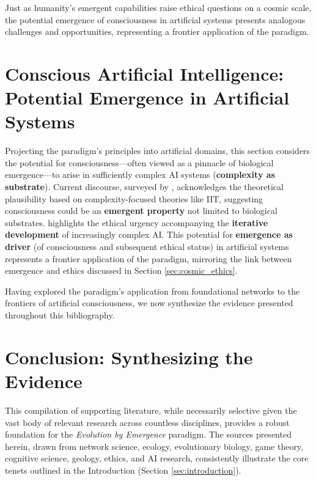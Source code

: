 Just as humanity's emergent capabilities raise ethical questions on a cosmic scale, the potential emergence of consciousness in artificial systems presents analogous challenges and opportunities, representing a frontier application of the paradigm.

\section{Conscious Artificial Intelligence: Potential Emergence in Artificial Systems} \label{sec:ai}
Projecting the paradigm's principles into artificial domains, this section considers the potential for consciousness—often viewed as a pinnacle of biological emergence—to arise in sufficiently complex AI systems (\textbf{complexity as substrate}). Current discourse, surveyed by \citet{lenharo2023ai}, acknowledges the theoretical plausibility based on complexity-focused theories like IIT, suggesting consciousness could be an \textbf{emergent property} not limited to biological substrates. \citet{sutskever2023conscious} highlights the ethical urgency accompanying the \textbf{iterative development} of increasingly complex AI. This potential for \textbf{emergence as driver} (of consciousness and subsequent ethical status) in artificial systems represents a frontier application of the paradigm, mirroring the link between emergence and ethics discussed in Section \ref{sec:cosmic_ethics}.

Having explored the paradigm's application from foundational networks to the frontiers of artificial consciousness, we now synthesize the evidence presented throughout this bibliography.

\section*{Conclusion: Synthesizing the Evidence} \label{sec:conclusion}

This compilation of supporting literature, while necessarily selective given the vast body of relevant research across countless disciplines, provides a robust foundation for the \emph{Evolution by Emergence} paradigm. The sources presented herein, drawn from network science, ecology, evolutionary biology, game theory, cognitive science, geology, ethics, and AI research, consistently illustrate the core tenets outlined in the Introduction (Section \ref{sec:introduction}).

